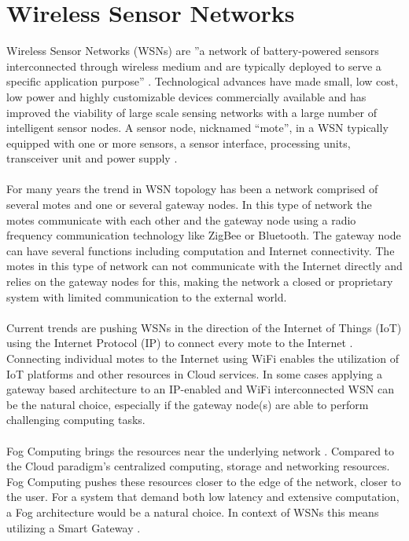 \documentclass[]{uiophd}
\begin{document}
\section{Wireless Sensor Networks}
Wireless Sensor Networks (WSNs) are ''a network of battery-powered sensors interconnected through wireless medium and are typically deployed to serve a specific application purpose'' \cite[p.~68]{Ojha2015662}. Technological advances have made small, low cost, low power and highly customizable devices commercially available and has improved the viability of large scale sensing networks with a large number of intelligent sensor nodes. A sensor node, nicknamed “mote”, in a WSN typically equipped with one or more sensors, a sensor interface, processing units, transceiver unit and power supply \cite{Gubbi20131645}.
\\\\
For many years the trend in WSN topology has been a network comprised of several motes and one or several gateway nodes. In this type of network the motes communicate with each other and the gateway node using a radio frequency communication technology like ZigBee or Bluetooth. The gateway node can have several functions including computation and Internet connectivity. The motes in this type of network can not communicate with the Internet directly and relies on the gateway nodes for this, making the network a closed or proprietary system with limited communication to the external world. 
\\\\
Current trends are pushing WSNs in the direction of the Internet of Things (IoT) using the Internet Protocol (IP) to connect every mote to the Internet \cite{6064380}. Connecting individual motes to the Internet using WiFi enables the utilization of IoT platforms and other resources in Cloud services. In some cases applying a gateway based architecture to an IP-enabled and WiFi interconnected WSN can be the natural choice, especially if the gateway node(s) are able to perform challenging computing tasks.
\\\\
Fog Computing brings the resources near the underlying network \cite{Fog}. Compared to the Cloud paradigm's centralized computing, storage and networking resources. Fog Computing pushes these resources closer to the edge of the network, closer to the user. For a system that demand both low latency and extensive computation, a Fog architecture would be a natural choice. In context of WSNs this means utilizing a Smart Gateway \cite{Fog}. 
\end{document}
